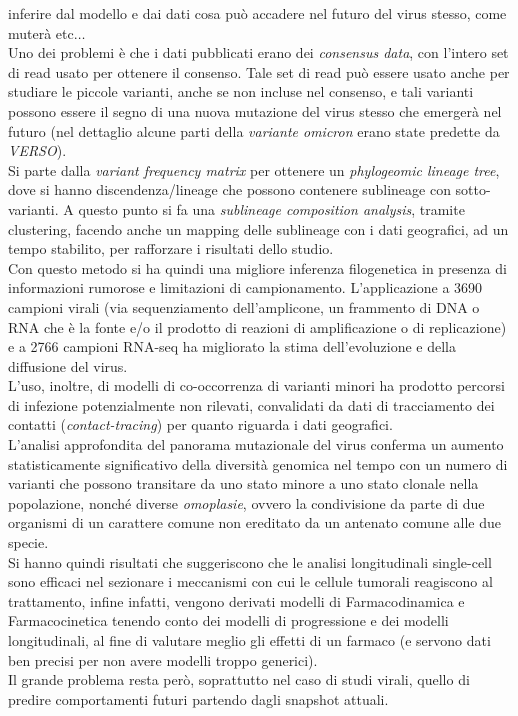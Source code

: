\documentclass[a4paper,12pt, oneside]{book}
\begin{document}
inferire dal modello e dai dati cosa può accadere nel futuro del virus stesso,
come muterà etc$\ldots$\\
Uno dei problemi è che i dati pubblicati erano dei \textit{consensus data}, con
l'intero set di read usato per ottenere il consenso. Tale set di read può essere
usato anche per studiare le piccole varianti, anche se non incluse nel consenso,
e tali varianti possono essere il segno di una nuova mutazione del virus stesso
che emergerà nel futuro (nel dettaglio alcune parti della \textit{variante
  omicron} erano state predette da \textit{VERSO}).\\
Si parte dalla \textit{variant frequency matrix} per ottenere un
\textit{phylogeomic lineage tree}, dove si hanno discendenza/lineage che possono
contenere sublineage con sotto-varianti. A questo punto si fa una
\textit{sublineage composition analysis}, tramite clustering, facendo anche un
mapping delle sublineage con i dati geografici, ad un tempo stabilito, per
rafforzare i risultati dello studio. \\
Con questo metodo si ha quindi una migliore inferenza filogenetica in presenza
di informazioni rumorose e limitazioni di campionamento. L'applicazione a 3690
campioni virali (via sequenziamento dell'amplicone, un frammento di DNA o RNA
che è la fonte e/o il prodotto di reazioni di amplificazione o di replicazione)
e a 2766 campioni RNA-seq ha 
migliorato la stima dell'evoluzione e della diffusione del virus. \\
L'uso, inoltre, di modelli di co-occorrenza di varianti minori ha prodotto
percorsi di infezione potenzialmente non rilevati, convalidati da dati di
tracciamento dei contatti (\textit{contact-tracing}) per quanto riguarda i dati
geografici.\\ 
L'analisi approfondita del panorama mutazionale del virus conferma un aumento
statisticamente significativo della diversità genomica nel tempo con un numero
di varianti che possono transitare da uno stato minore a uno stato clonale nella
popolazione, nonché diverse \textit{omoplasie}, ovvero la condivisione da parte
di due organismi di un carattere comune non ereditato da un antenato comune alle
due specie.\\
Si hanno quindi risultati che suggeriscono che le analisi longitudinali
single-cell sono efficaci nel sezionare i meccanismi con cui le cellule 
tumorali reagiscono al trattamento, infine infatti, vengono derivati modelli di
Farmacodinamica e 
Farmacocinetica tenendo conto dei modelli di progressione e dei modelli
longitudinali, al fine di valutare meglio gli effetti di un farmaco (e servono
dati ben precisi per non avere modelli troppo generici).\\
Il grande problema resta però, soprattutto nel caso di studi virali, quello di
predire comportamenti futuri partendo dagli snapshot attuali.
\end{document}

